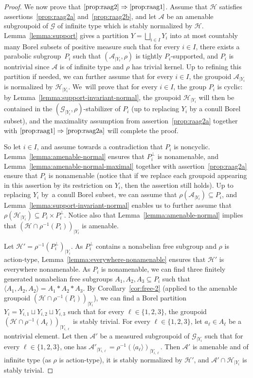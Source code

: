 \documentclass[JEP,XML,SOM,Unicode,NoFloatCountersInSection,published]{cedram}
\let\mathcal\mathscr
\theoremstyle{plain}
\theoremstyle{definition}
\let\dunion\sqcup
\let\Dunion\bigsqcup
\newcommand{\cala}{\mathcal{A}}
\newcommand{\calg}{\mathcal{G}}
\newcommand{\calh}{\mathcal{H}}
\begin{document}
\begin{proof}
We now prove that $\eqref{prop:raag2}\Rightarrow\eqref{prop:raag1}$. Assume that $\calh$ satisfies assertions~\eqref{prop:raag2a} and~\eqref{prop:raag2b}, and let $\cala$ be an amenable subgroupoid of $\calg$ of infinite type which is stably normalized by $\calh$. Lemma~\ref{lemma:support} gives a partition $Y=\Dunion_{i\in I} Y_i$ into at most countably many Borel subsets of positive measure such that for every $i\in I$, there exists a parabolic subgroup~$P_i$ such that $(\cala_{|Y_i},\rho)$ is tightly $P_i$-supported, and $P_i$ is nontrivial since $\cala$ is of infinite type and $\rho$ has trivial kernel. Up to refining this partition if needed, we can further assume that for every $i\in I$, the groupoid $\cala_{|Y_i}$ is normalized by $\calh_{|Y_i}$. We~will prove that for every $i\in I$, the group $P_i$ is cyclic: by Lemma~\ref{lemma:support-invariant-normal}, the groupoid $\calh_{|Y_i}$ will then be contained in the $(\calg_{|Y_i},\rho)$-stabilizer of $P_i$ (up to replacing $Y_i$ by a conull Borel subset), and the maximality assumption from assertion~\eqref{prop:raag2a} together with $\eqref{prop:raag1}\Rightarrow \eqref{prop:raag2a}$ will complete the proof.

So let $i\in I$, and assume towards a contradiction that $P_i$ is noncyclic. Lemma~\ref{lemma:amenable-normal} ensures that $P_i^\perp$ is nonamenable, and Lemma~\ref{lemma:amenable-normal-maximal} together with assertion~\eqref{prop:raag2a} ensure that $P_i$ is nonamenable (notice that if we replace each groupoid appearing in this assertion by its restriction on $Y_i$, then the assertion still holds). Up to replacing $Y_i$ by~a conull Borel subset, we can assume that $\rho(\cala_{|Y_i})\subseteq P_i$, and Lemma~\ref{lemma:support-invariant-normal} enables us to further assume that $\rho(\calh_{|Y_i})\subseteq P_i\times P_i^\perp$. Notice also that Lemma~\ref{lemma:amenable-normal} implies that $(\calh\cap\rho^{-1}(P_i))_{|Y_i}$ is amenable.

Let $\calh'=\rho^{-1}(P_i^{\perp})_{|Y_i}$. As $P_i^{\perp}$ contains a nonabelian free subgroup and $\rho$ is action-type, Lemma~\ref{lemma:everywhere-nonamenable} ensures that $\calh'$ is everywhere nonamenable. As $P_i$ is nonamenable, we can find three finitely generated nonabelian free subgroups $A_1,A_2,A_3\subseteq P_i$ such that $\langle A_1,A_2,A_2\rangle=A_1\ast A_2\ast A_3$. By Corollary~\ref{cor:free-2} (applied to the amenable groupoid $(\calh\cap\rho^{-1}(P_i))_{|Y_i}$), we can find a Borel partition $Y_i=Y_{i,1}\dunion Y_{i,2}\dunion Y_{i,3}$ such that for every $\ell\in\{1,2,3\}$, the groupoid $(\calh\cap\rho^{-1}(A_\ell))_{|Y_{i,\ell}}$ is stably trivial. For every $\ell\in\{1,2,3\}$, let $a_\ell\in A_\ell$ be a nontrivial element. Let then $\cala'$ be a measured subgroupoid of $\calg_{|Y_i}$ such that for every $\ell\in\{1,2,3\}$, one has $\cala'_{|Y_{i,\ell}}=\rho^{-1}(\langle a_\ell\rangle)_{|Y_{i,\ell}}$. Then $\cala'$ is amenable and of infinite type (as $\rho$ is action-type), it is stably normalized by $\calh'$, and $\cala'\cap\calh_{|Y_i}$ is stably trivial.


\end{proof}
\end{document}
